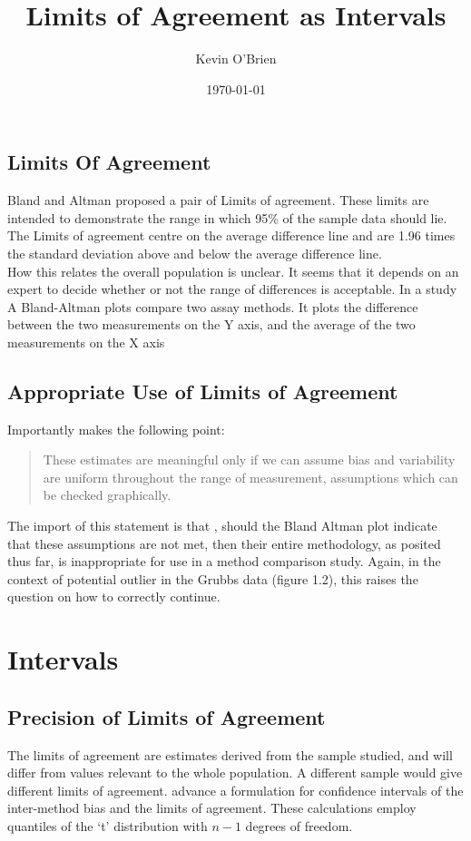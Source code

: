 \documentclass[12pt, a4paper]{article}
\begin{document}
\author{Kevin O'Brien}
\title{Limits of Agreement as Intervals}
\date{\today}
\maketitle

\tableofcontents
\setcounter{tocdepth}{2}

\newpage
\subsection{Limits Of Agreement}
Bland and Altman proposed a pair of Limits of agreement. These
limits are intended to demonstrate the range in which 95\% of the
sample data should lie. The Limits of agreement centre on the
average difference line and are 1.96 times the standard deviation
above and below the average difference line.
\\
How this relates the overall population is unclear. It seems that
it depends on an expert to decide whether or not the range of
differences is acceptable. In a study A Bland-Altman plots compare
two assay methods. It plots the difference between the two
measurements on the Y axis, and the average of the two
measurements on the X axis
\subsection{Appropriate Use of Limits of Agreement}
Importantly \citet{BA99} makes the following point:
\begin{quote}These estimates are meaningful only if we can assume
bias and variability are uniform throughout the range of
measurement, assumptions which can be checked graphically.
\end{quote}

The import of this statement is that , should the Bland Altman
plot indicate that these assumptions are not met, then their
entire methodology, as posited thus far, is inappropriate for use
in a method comparison study. Again, in the context of potential
outlier in the Grubbs data (figure 1.2), this raises the question
on how to correctly continue.
\section{Intervals}
\subsection{Precision of Limits of Agreement}
The limits of agreement are estimates derived from the sample
studied, and will differ from values relevant to the whole
population. A different sample would give different limits of
agreement. \citet*{BA86} advance a formulation for confidence
intervals of the inter-method bias and the limits of agreement.
These calculations employ quantiles of the `t' distribution with
$n -1$ degrees of freedom.
\end{document}
